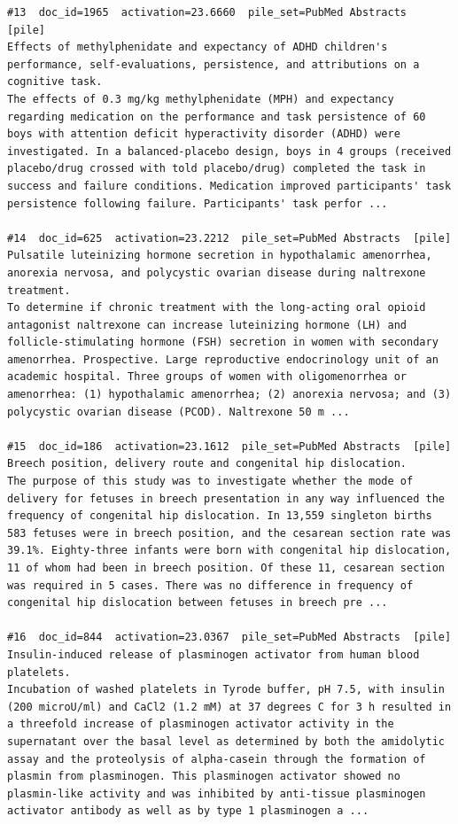 \begin{verbatim}
#13  doc_id=1965  activation=23.6660  pile_set=PubMed Abstracts  [pile]
Effects of methylphenidate and expectancy of ADHD children's performance, self-evaluations, persistence, and attributions on a cognitive task.
The effects of 0.3 mg/kg methylphenidate (MPH) and expectancy regarding medication on the performance and task persistence of 60 boys with attention deficit hyperactivity disorder (ADHD) were investigated. In a balanced-placebo design, boys in 4 groups (received placebo/drug crossed with told placebo/drug) completed the task in success and failure conditions. Medication improved participants' task persistence following failure. Participants' task perfor ...

#14  doc_id=625  activation=23.2212  pile_set=PubMed Abstracts  [pile]
Pulsatile luteinizing hormone secretion in hypothalamic amenorrhea, anorexia nervosa, and polycystic ovarian disease during naltrexone treatment.
To determine if chronic treatment with the long-acting oral opioid antagonist naltrexone can increase luteinizing hormone (LH) and follicle-stimulating hormone (FSH) secretion in women with secondary amenorrhea. Prospective. Large reproductive endocrinology unit of an academic hospital. Three groups of women with oligomenorrhea or amenorrhea: (1) hypothalamic amenorrhea; (2) anorexia nervosa; and (3) polycystic ovarian disease (PCOD). Naltrexone 50 m ...

#15  doc_id=186  activation=23.1612  pile_set=PubMed Abstracts  [pile]
Breech position, delivery route and congenital hip dislocation.
The purpose of this study was to investigate whether the mode of delivery for fetuses in breech presentation in any way influenced the frequency of congenital hip dislocation. In 13,559 singleton births 583 fetuses were in breech position, and the cesarean section rate was 39.1%. Eighty-three infants were born with congenital hip dislocation, 11 of whom had been in breech position. Of these 11, cesarean section was required in 5 cases. There was no difference in frequency of congenital hip dislocation between fetuses in breech pre ...

#16  doc_id=844  activation=23.0367  pile_set=PubMed Abstracts  [pile]
Insulin-induced release of plasminogen activator from human blood platelets.
Incubation of washed platelets in Tyrode buffer, pH 7.5, with insulin (200 microU/ml) and CaCl2 (1.2 mM) at 37 degrees C for 3 h resulted in a threefold increase of plasminogen activator activity in the supernatant over the basal level as determined by both the amidolytic assay and the proteolysis of alpha-casein through the formation of plasmin from plasminogen. This plasminogen activator showed no plasmin-like activity and was inhibited by anti-tissue plasminogen activator antibody as well as by type 1 plasminogen a ...


\end{verbatim}

